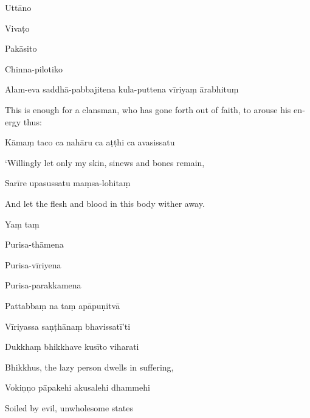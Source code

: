 Uttāno


Vivaṭo


Pakāsito


Chinna-pilotiko


Alam-eva saddhā-pabbajitena kula-puttena vīriyaṃ ārabhituṃ

\begin{english}
  This is enough for a clansman, who has gone forth out of faith,
  to arouse his energy thus:
\end{english}

Kāmaṃ taco ca nahāru ca aṭṭhi ca avasissatu

\begin{english}
  `Willingly let only my skin, sinews and bones remain,
\end{english}

Sarīre upasussatu maṃsa-lohitaṃ

\begin{english}
  And let the flesh and blood in this body wither away.
\end{english}

Yaṃ taṃ


Purisa-thāmena


Purisa-vīriyena


Purisa-parakkamena


Pattabbaṃ na taṃ apāpuṇitvā


Vīriyassa saṇṭhānaṃ bhavissatī'ti


Dukkhaṃ bhikkhave kusīto viharati

\begin{english}
  Bhikkhus, the lazy person dwells in suffering,
\end{english}

Vokiṇṇo pāpakehi akusalehi dhammehi

\begin{english}
  Soiled by evil, unwholesome states
\end{english}


